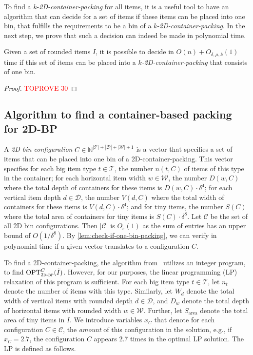 \documentclass[a4paper,UKenglish,cleveref, autoref, thm-restate]{lipics-v2021}
\newcommand{\eps}{\varepsilon}
\newcommand{\opt}{\mathrm{OPT}}
\newcommand{\twobp}{\textsc{2d-bp}\xspace}
\newcommand{\bigy}{big\xspace}
\newcommand{\tin}{tiny\xspace}
\newcommand{\area}{\mathrm{area}}
\begin{document}
To find a $k$-\emph{2D-container-packing} for all items, it is a useful tool to have an algorithm that can decide for a set of items if these items can be placed into one bin, that fulfills the requirements to be a bin of a $k$-\emph{2D-container-packing}.
In the next step, we prove that such a decision can indeed be made in polynomial time.

\begin{lemma}
\label{lem:check-if-one-bin-packing}
    Given a set of rounded items $I$, it is possible to decide in $O(n)+ O_{\delta,\mu,k}(1)$ time if this set of items can be placed into a \emph{$k$-2D-container-packing} that consists of one bin. 
\end{lemma}
\begin{proof}\textcolor{red}{TOPROVE 30}\end{proof}

\subsection{Algorithm to find a container-based packing for 2D-BP}

A {\em 2D bin configuration} $C \in \mathbb{N}^{|\mathcal{T}|+|\mathcal{D}|+|\mathcal{W}|+1}$ is a vector that specifies a set of items that can be placed into one bin of a 2D-container-packing. 
This vector specifies for each \bigy item type $t \in \mathcal{T}$, the number $n(t,C)$ of items of this type in the container; for each horizontal item width $w \in \mathcal{W}$,  the number $D(w,C)$ where the total depth of containers for these items is $D(w,C) \cdot \delta^4$; for each vertical item depth $d \in \mathcal{D}$, the number $V(d,C)$ where the total width of containers for these items is $V(d,C)\cdot \delta^4$; and for \tin items, the number $S(C)$  where the total area of containers for \tin items is $S(C)\cdot \delta^8$.
Let $\mathcal{C}$ be the set of all 2D bin configurations.
Then $|\mathcal{C}|$ is $O_{\eps}(1)$ as the sum of entries has an upper bound of $O(1/\delta^8)$. 
By \cref{lem:check-if-one-bin-packing}, we can verify in polynomial time if a given vector translates to a configuration $C$.

To find a 2D-container-packing, the algorithm from~\cite{jansen2016new} utilizes an integer program, to find $\opt_{\twobp}^{C}(\tilde{I})$. 
However, for our purposes, the linear programming (LP) relaxation of this program is sufficient.
For each \bigy item type $t \in \mathcal{T}$, let $n_t$ denote the number of items with this type. 
Similarly, let $W_d$ denote the total width of vertical items with rounded depth $d \in \mathcal{D}$, 
and $D_w$ denote the total depth of horizontal items with rounded width $w \in \mathcal{W}$. 
Further, 
let $S_{\area}$ denote the total area of \tin items in $I$.
We introduce variables $x_C$ that denote for each configuration $C \in \mathcal{C}$, the {\em amount} of this configuration in the solution, e.g., if $x_C= 2.7$, the configuration $C$ appears 2.7 times in the optimal LP solution. 
The LP is defined as follows. 
\end{document}
